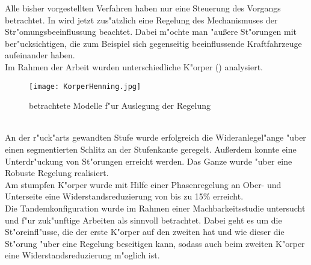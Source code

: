 Alle bisher vorgestellten Verfahren haben nur eine Steuerung des Vorgangs betrachtet. In \cite{Henning.2008} wird jetzt zus"atzlich eine Regelung des Mechanismuses der Str"omungsbeeinflussung beachtet. Dabei m"ochte man "au\ss{}ere St"orungen mit ber"ucksichtigen, die zum Beispiel sich gegenseitig beeinflussende Kraftfahrzeuge aufeinander haben.\\
Im Rahmen der Arbeit wurden unterschiedliche K"orper () analysiert.
\begin{figure}[h]
	\centering
	\texttt{[image: KorperHenning.jpg]}
	\caption{betrachtete Modelle f"ur Auslegung der Regelung \cite{Henning.2008}}
	\label{fig:Henning}
\end{figure}\\
An der r"uck"arts gewandten Stufe wurde erfolgreich die Wideranlegel"ange "uber einen segmentierten Schlitz an der Stufenkante geregelt. Au\ss{}erdem konnte eine Unterdr"uckung von St"orungen erreicht werden. Das Ganze wurde "uber eine Robuste Regelung realisiert.\\
Am stumpfen K"orper wurde mit Hilfe einer Phasenregelung an Ober- und Unterseite eine Widerstandsreduzierung von bis zu 15\% erreicht.\\
Die Tandemkonfiguration wurde im Rahmen einer Machbarkeitsstudie untersucht und f"ur zuk"unftige Arbeiten als sinnvoll betrachtet. Dabei geht es um die St"oreinfl"usse, die der erste K"orper auf den zweiten hat und wie dieser die St"orung "uber eine Regelung beseitigen kann, sodass auch beim zweiten K"orper eine Widerstandsreduzierung m"oglich ist.
